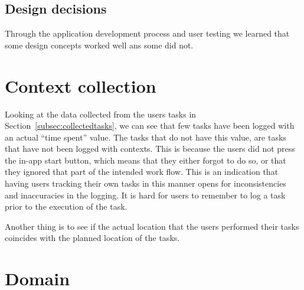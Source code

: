 \subsection{Design decisions}
Through the application development process and user testing we learned that some design concepts worked well ans some did not.



\section{Context collection}

Looking at the data collected from the users tasks in Section~\ref{subsec:collectedtasks}, we can see that few tasks have been logged with an actual ``time spent'' value. The tasks that do not have this value, are tasks that have not been logged with contexts. This is because the users did not press the in-app start button, which means that they either forgot to do so, or that they ignored that part of the intended work flow. This is an indication that having users tracking their own tasks in this manner opens for inconsistencies and inaccuracies in the logging. It is hard for users to remember to log a task prior to the execution of the task.


Another thing is to see if the actual location that the users performed their tasks coincides with the planned location of the tasks.


\section{Domain}

